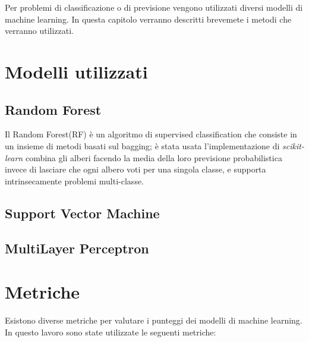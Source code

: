 Per problemi di classificazione o di previsione vengono utilizzati diversi modelli di machine learning. In questa capitolo verranno descritti brevemete i metodi che verranno utilizzati.
\section{Modelli utilizzati}
\subsection{Random Forest}
\label{ssec:RF}
Il Random Forest(RF) è un algoritmo di supervised classification che consiste in un insieme di metodi basati sul bagging\cite{Random Forest}; è stata usata l'implementazione di \textit{scikit-learn} combina gli alberi facendo la media della loro previsione probabilistica invece di lasciare che ogni albero voti per una singola classe, e supporta intrinsecamente problemi multi-classe.
\subsection{Support Vector Machine}
\label{ssec:SVM}

\subsection{MultiLayer Perceptron}
\label{ssec:MLP}
\section{Metriche}
\label{metrics}
Esistono diverse metriche per valutare i punteggi dei modelli di machine learning. In questo lavoro sono state utilizzate le seguenti metriche:


